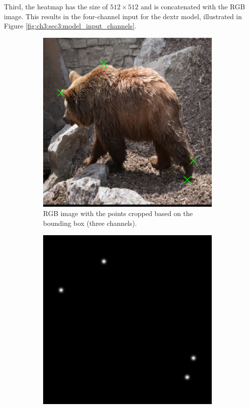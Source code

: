 Third, the heatmap has the size of $512 \times 512$  and is concatenated with the RGB image.
This results in the four-channel input for the \gls{dextr} model, illustrated in Figure \ref{fig:ch3:sec3:model_input_channels}.

\begin{figure}
	\centering
	\begin{subfigure}[t]{0.3\textwidth}
		\centering
		\includegraphics[width=\textwidth]{figures/chap33_channel_rgb.png}
		\caption{RGB image with the points cropped based on the bounding box (three channels).}
		\label{fig:ch3:sec3:rgb_channel}
	\end{subfigure}
	\hfill
	\begin{subfigure}[t]{0.3\textwidth}
		\centering
		\includegraphics[width=\textwidth]{figures/chap33_channel_fg.png}

\end{subfigure}
\end{figure}
